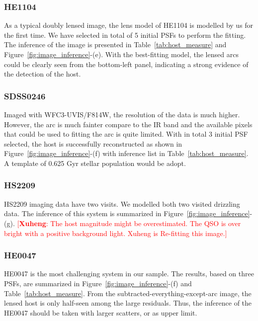 \documentclass[fleqn,usenatbib]{mnras}
\newcommand{\ding}[1]{\textcolor{red}{[{\bf Xuheng}: #1]}}
\begin{document}
\subsubsection{HE1104}
As a typical doubly lensed image, the lens model of HE1104 is modelled by us for the first time. We have selected in total of 5 initial PSFs to perform the fitting. The inference of the image is presented in Table~\ref{tab:host_measure} and Figure~\ref{fig:image_inference}-(e).  With the best-fitting model, the lensed arcs could be clearly seen from the bottom-left panel, indicating a strong evidence of the detection of the host.

\subsubsection{SDSS0246}
Imaged with WFC3-UVIS/F814W, the resolution of the data is much higher. However, the arc is much fainter compare to the IR band and the available pixels that could be used to fitting the arc is quite limited. With in total 3 initial PSF selected, the host is successfully reconstructed as shown in Figure~\ref{fig:image_inference}-(f) with inference list in Table~\ref{tab:host_measure}. A template of 0.625 Gyr stellar population would be adopt.

\subsubsection{HS2209}
HS2209 imaging data have two visits. We modelled both two visited drizzling data.
The inference of this system is summarized in Figure~\ref{fig:image_inference}-(g). \ding{The host magnitude might be overestimated. The QSO is over bright with a positive background light. Xuheng is Re-fitting this image.}

\subsubsection{HE0047}
HE0047 is the most challenging system in our sample. The results, based on three PSFs, are summarized in Figure~\ref{fig:image_inference}-(f) and Table~\ref{tab:host_measure}. From the subtracted-everything-except-arc image, the lensed host is only half-seen among the large residuals. Thus, the inference of the HE0047 should be taken with larger scatters, or as upper limit.
\end{document}
